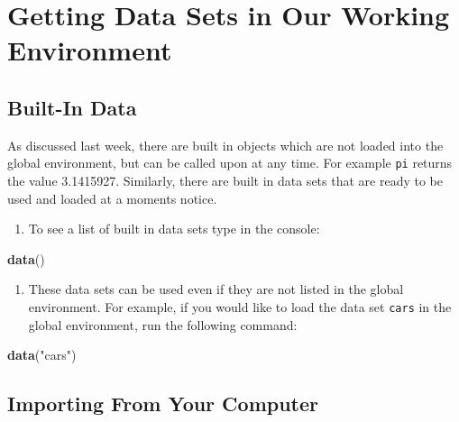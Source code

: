 \documentclass[
]{book}
\newenvironment{Shaded}{\begin{snugshade}}{\end{snugshade}}
\newcommand{\KeywordTok}[1]{\textcolor[rgb]{0.13,0.29,0.53}{\textbf{#1}}}
\newcommand{\NormalTok}[1]{#1}
\newcommand{\StringTok}[1]{\textcolor[rgb]{0.31,0.60,0.02}{#1}}
\providecommand{\tightlist}{%
  \setlength{\itemsep}{0pt}\setlength{\parskip}{0pt}}
\begin{document}
\hypertarget{getting-data-sets-in-our-working-environment}{%
\section{Getting Data Sets in Our Working Environment}\label{getting-data-sets-in-our-working-environment}}

\hypertarget{built-in-data}{%
\subsection*{Built-In Data}\label{built-in-data}}

As discussed last week, there are built in objects which are not loaded into the global environment, but can be called upon at any time. For example \texttt{pi} returns the value 3.1415927. Similarly, there are built in data sets that are ready to be used and loaded at a moments notice.

\begin{enumerate}
\def\labelenumi{\arabic{enumi})}
\tightlist
\item
  To see a list of built in data sets type in the console:
\end{enumerate}

\begin{Shaded}
\begin{Highlighting}[]
\KeywordTok{data}\NormalTok{()}
\end{Highlighting}
\end{Shaded}

\begin{enumerate}
\def\labelenumi{\arabic{enumi})}
\setcounter{enumi}{1}
\tightlist
\item
  These data sets can be used even if they are not listed in the global environment. For example, if you would like to load the data set \texttt{cars} in the global environment, run the following command:
\end{enumerate}

\begin{Shaded}
\begin{Highlighting}[]
\KeywordTok{data}\NormalTok{(}\StringTok{"cars"}\NormalTok{)}
\end{Highlighting}
\end{Shaded}

\hypertarget{importing-from-your-computer}{%
\subsection*{Importing From Your Computer}\label{importing-from-your-computer}}
\end{document}
